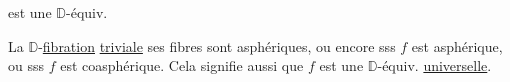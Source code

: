 est une $\mathbb D$-équiv.


La $\mathbb D$-\uline{fibration}   \uline{triviale}   ses fibres sont asphériques, ou encore sss $f$ est asphérique, ou sss $f$ est coasphérique. Cela signifie aussi que $f$ est une $\mathbb D$-équiv. \uline{universelle}.
